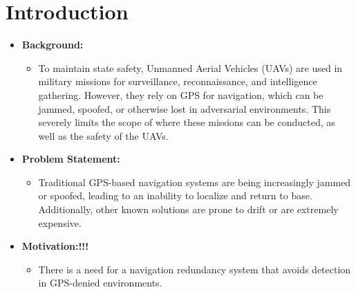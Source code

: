 \section{Introduction}
\begin{itemize}
    \item \textbf{Background:}
    \begin{itemize}
        \item To maintain state safety, Unmanned Aerial Vehicles (UAVs) are used in military missions for surveillance, reconnaissance, and intelligence gathering. However, they rely on GPS for navigation, which can be jammed, spoofed, or otherwise lost in adversarial environments. This severely limits the scope of where these missions can be conducted, as well as the safety of the UAVs.
    \end{itemize}
    \item \textbf{Problem Statement:}
    \begin{itemize}
        \item Traditional GPS-based navigation systems are being increasingly jammed or spoofed, leading to an inability to localize and return to base. Additionally, other known solutions are prone to drift or are extremely expensive. 
    \end{itemize}
    \item \textbf{Motivation:!!!}
    \begin{itemize}
        \item There is a need for a navigation redundancy system that avoids detection in GPS-denied environments. 
    \end{itemize}
\end{itemize}

